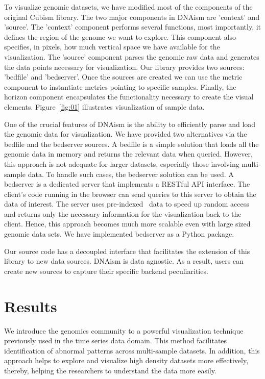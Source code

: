 \documentclass{bioinfo}
\begin{document}
To visualize genomic datasets, we have modified most of the components of the
original Cubism library.  The two major components in DNAism are 'context' and
'source'.  The 'context' component performs several functions, most
importantly, it defines the region of the genome we want to explore. This
component also specifies, in pixels, how much vertical space we have available
for the visualization.  The 'source' component parses the genomic raw data and
generates the data points necessary for visualization. Our library provides two
sources: 'bedfile' and 'bedserver'. Once the sources are created we can use the
metric component to instantiate metrics pointing to specific samples.  Finally,
the horizon component encapsulates the functionality necessary to create the
visual elements. Figure~\ref{fig:01} illustrates visualization of sample data.

One of the crucial features of DNAism is the ability to efficiently parse and
load the genomic data for visualization. We have provided two alternatives via
the bedfile and the bedserver sources. A bedfile is a simple solution that
loads all the genomic data in memory and returns the relevant data when
queried.  However, this approach is not adequate for larger datasets,
especially those involving multi-sample data. To handle such cases, the
bedserver solution can be used. A bedserver is a dedicated server that
implements a RESTful API interface. The client's code running in the browser
can send queries to this server to obtain the data of interest.  The server
uses pre-indexed~\citep{tabix-li} data to speed up random access and returns
only the necessary information for the visualization back to the client.
Hence, this approach becomes much more scalable even with large sized genomic
data sets. We have implemented bedserver as a Python package.

Our source code has a decoupled interface that facilitates the extension of
this library to new data sources. DNAism is data agnostic. As a result, users
can create new sources to capture their specific backend peculiarities.


\section{Results}

We introduce the genomics community to a powerful visualization technique
previously used in the time series data domain. This method facilitates
identification of abnormal patterns across multi-sample datasets.  In addition, this
approach helps to explore and visualize high density datasets more effectively,
thereby, helping the researchers to understand the data more easily.
\end{document}
